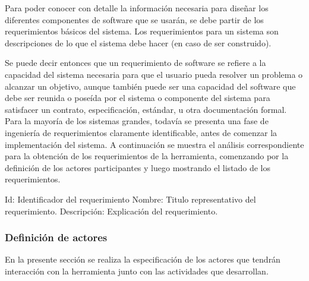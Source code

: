 Para poder conocer con detalle la información necesaria para diseñar los diferentes componentes de software que se usarán, se debe partir de los requerimientos básicos del sistema. Los requerimientos para un sistema son descripciones de lo que el sistema debe hacer (en caso de ser construido)\cite{A01}. 

\vspace{1em}

Se puede decir entonces que un requerimiento de software se refiere a la capacidad del sistema necesaria para que el usuario pueda resolver un problema o alcanzar un objetivo, aunque también puede ser una capacidad del software que debe ser reunida o poseída por el sistema o componente del sistema para satisfacer un contrato, especificación, estándar, u otra documentación formal. Para la mayoría de los sistemas grandes, todavía se presenta una fase de ingeniería de requerimientos claramente identificable, antes de comenzar la implementación del sistema\cite{A01}. A continuación se muestra el análisis correspondiente para la obtención de los requerimientos de la herramienta, comenzando por la definición de los actores participantes y luego mostrando el listado de los requerimientos.

\begin{outline}
\1 Id: Identificador del requerimiento
\1 Nombre: Titulo representativo del requerimiento.
\1 Descripción: Explicación del requerimiento.
\end{outline}

\subsubsection{Definición de actores}

En la presente sección se realiza la especificación de los actores que tendrán interacción con la herramienta junto con las actividades que desarrollan.

